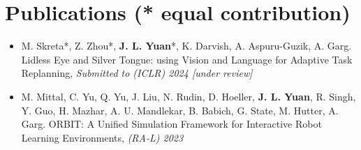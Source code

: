 \documentclass[letterpaper,11pt]{article}
\begin{document}
\section{Publications \small{(* equal contribution)}}
  \begin{itemize}[leftmargin=0.15in, label={}, itemsep=-5pt]
    \item{
    \footnotesize{M. Skreta*, Z. Zhou*,  \textbf{J. L. Yuan}*, K. Darvish, A. Aspuru-Guzik, A. Garg. Lidless Eye and Silver Tongue: using Vision and Language for Adaptive Task Replanning, \textit{Submitted to (ICLR) 2024 [under review]}}
    }
  \end{itemize}\vspace{-20pt}
\begin{itemize}[leftmargin=0.15in, label={}, itemsep=-5pt]
    \item{
    \footnotesize{M. Mittal, C. Yu, Q. Yu, J. Liu, N. Rudin, D. Hoeller, \textbf{J. L. Yuan}, R. Singh, Y. Guo, H. Mazhar, A. U. Mandlekar, B. Babich, G. State, M. Hutter, A. Garg. ORBIT: A Unified Simulation Framework for Interactive Robot Learning Environments, \textit{(RA-L) 2023}}
    }
 \end{itemize}
\vspace{-20pt}
 
\end{document}
